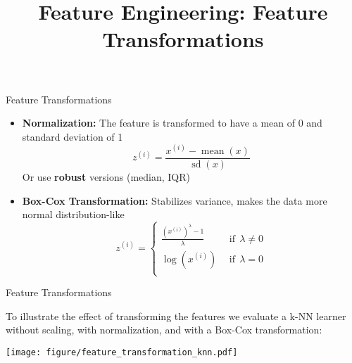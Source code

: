 



\newcommand{\titlefigure}{feature_transformations_title.png}
\newcommand{\learninggoals}{
  \item Learn common feature transformations: normalization, Box-Cox
  \item Understand when scaling and transformations are necessary
  \item Know the impact of transformations on different algorithms
  \item Apply domain knowledge for creating meaningful features
}

\title{Feature Engineering: Feature Transformations}
\date{}





\sloppy


\begin{vbframe}{Feature Transformations}

\begin{itemize}
\item \textbf{Normalization:} The feature is transformed to have a mean of 0 and standard deviation of 1
    $$z^{(i)} = \frac{x^{(i)} - \operatorname{mean}(x)}{\operatorname{sd}(x)}$$
    Or use \textbf{robust} versions (median, IQR)

\lz

\item \textbf{Box-Cox Transformation:} Stabilizes variance, makes the data more normal distribution-like
    $$z^{(i)} = \left\{\begin{array}{cc}
    \frac{\left(x^{(i)}\right)^\lambda - 1}{\lambda} & \ \ \text{if} \ \ \lambda \neq 0 \\
    \log(x^{(i)}) & \ \ \text{if} \ \ \lambda = 0 \\
    \end{array}\right.$$
\end{itemize}

\end{vbframe}

\begin{vbframe}{Feature Transformations}

To illustrate the effect of transforming the features we evaluate a k-NN learner without scaling, with normalization, and with a Box-Cox transformation:

\vfill

\begin{center}
\texttt{[image: figure/feature\_transformation\_knn.pdf]}
\end{center}

\vfill

\end{vbframe}

